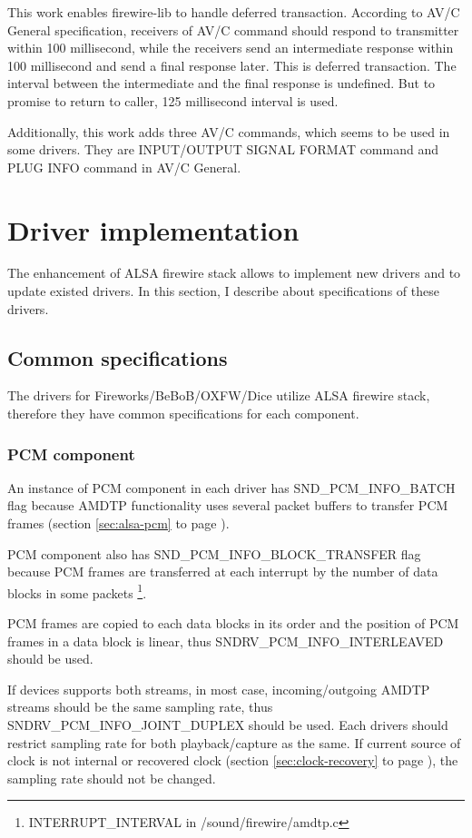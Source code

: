 \documentclass[onecolumn]{jarticle}
\begin{document}
This work enables firewire-lib to handle deferred transaction. According to AV/C General specification\cite{avc-general-4-2}, receivers of AV/C command should respond to transmitter within 100 millisecond, while the receivers send an intermediate response within 100 millisecond and send a final response later. This is deferred transaction. The interval between the intermediate and the final response is undefined. But to promise to return to caller, 125 millisecond interval is used.

Additionally, this work adds three AV/C commands, which seems to be used in some drivers. They are INPUT/OUTPUT SIGNAL FORMAT command and PLUG INFO command in AV/C General\cite{avc-general-4-2}.

\section{Driver implementation}

The enhancement of ALSA firewire stack allows to implement new drivers and to update existed drivers. In this section, I describe about specifications of these drivers.

\subsection{Common specifications}

The drivers for Fireworks/BeBoB/OXFW/Dice utilize ALSA firewire stack, therefore they have common specifications for each component.

\subsubsection{PCM component}

An instance of PCM component in each driver has SND\_PCM\_INFO\_BATCH flag because AMDTP functionality uses several packet buffers to transfer PCM frames (section \ref{sec:alsa-pcm} to page \pageref{sec:alsa-pcm}).

PCM component also has SND\_PCM\_INFO\_BLOCK\_TRANSFER flag because PCM frames are transferred at each interrupt by the number of data blocks in some packets \footnote{INTERRUPT\_INTERVAL in /sound/firewire/amdtp.c}.

PCM frames are copied to each data blocks in its order and the position of PCM frames in a data block is linear, thus SNDRV\_PCM\_INFO\_INTERLEAVED should be used.

If devices supports both streams, in most case, incoming/outgoing AMDTP streams should be the same sampling rate, thus SNDRV\_PCM\_INFO\_JOINT\_DUPLEX should be used. Each drivers should restrict sampling rate for both playback/capture as the same. If current source of clock is not internal or recovered clock (section \ref{sec:clock-recovery} to page \pageref{sec:clock-recovery}), the sampling rate should not be changed.
\end{document}
